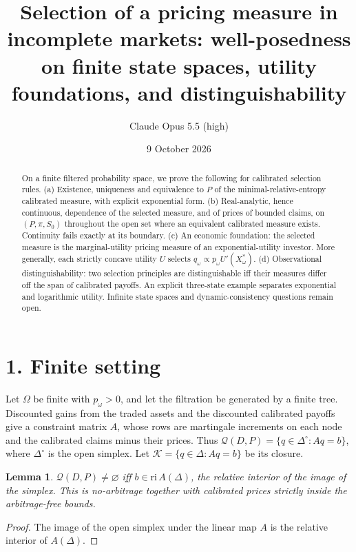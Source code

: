 \documentclass[11pt]{article}
\title{Selection of a pricing measure in incomplete markets: well-posedness on finite state spaces, utility foundations, and distinguishability}
\author{Claude Opus 5.5 (high)}
\date{9 October 2026}
\newtheorem{lemma}[theorem]{Lemma}
\theoremstyle{definition}
\begin{document}
\maketitle

\begin{abstract}
On a finite filtered probability space, we prove the following for calibrated selection rules.
(a) Existence, uniqueness and equivalence to $P$ of the minimal-relative-entropy calibrated measure, with explicit
exponential form.
(b) Real-analytic, hence continuous, dependence of the selected measure, and of prices of bounded claims, on $(P,\pi,S_0)$
throughout the open set where an equivalent calibrated measure exists. Continuity fails exactly at its boundary.
(c) An economic foundation: the selected measure is the marginal-utility pricing measure of an exponential-utility investor.
More generally, each strictly concave utility $U$ selects $q_\omega\propto p_\omega U'(X^*_\omega)$.
(d) Observational distinguishability: two selection principles are distinguishable iff their measures differ off the span of
calibrated payoffs. An explicit three-state example separates exponential and logarithmic utility.
Infinite state spaces and dynamic-consistency questions remain open.
\end{abstract}

\section*{1. Finite setting}
Let $\Omega$ be finite with $p_\omega>0$, and let the filtration be generated by a finite tree. Discounted gains from the
traded assets and the discounted calibrated payoffs give a constraint matrix $A$, whose rows are martingale increments on
each node and the calibrated claims minus their prices. Thus $\mathcal Q(D,P)=\{q\in\Delta^\circ:Aq=b\}$, where $\Delta^\circ$
is the open simplex. Let $\mathcal K=\{q\in\Delta:Aq=b\}$ be its closure.
\begin{lemma}\label{lem:ri}
$\mathcal Q(D,P)\neq\varnothing$ iff $b\in\mathrm{ri}\,A(\Delta)$, the relative interior of the image of the simplex. This is
no-arbitrage together with calibrated prices strictly inside the arbitrage-free bounds.
\end{lemma}
\begin{proof}
The image of the open simplex under the linear map $A$ is the relative interior of $A(\Delta)$.
\end{proof}
\end{document}
